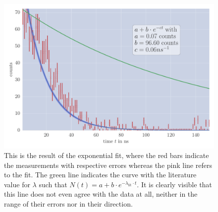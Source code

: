 \begin{figure}[htpb]
    \centering
    \includegraphics[width=0.8\linewidth]{analysis/figures/plot4_1_reg}
    \caption{This is the result of the exponential fit, where the red bars indicate the measurements with respective
errors whereas the pink line refers to the fit.
The green line indicates the curve with the literature value for $\lambda$ such 
that $N(t) = a + b\cdot e^{-\lambda_{\mathrm{lit}}\cdot t}$. It is clearly visible that this line does not even agree with
the data at all, neither in the range of their errors nor in their direction. }
    \label{fig:last_plot}
\end{figure}
